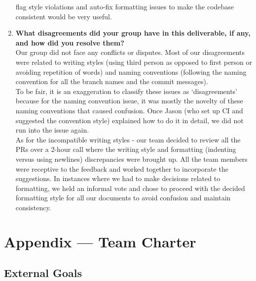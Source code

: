 \documentclass{article}
\begin{document}
\begin{enumerate}
    flag style violations and auto-fix formatting issues to make the codebase consistent would be very useful.
    \item \textbf{What disagreements did your group have in this deliverable, if any,
    and how did you resolve them?}\\
    \newline
    Our group did not face any conflicts or disputes. Most of our disagreements were related to writing styles
    (using third person as opposed to first person or avoiding repetition of words) and naming conventions (following
    the naming convention for all the branch names and the commit messages).\\
    \newline
    To be fair, it is an exaggeration to classify these issues as `disagreements' because for the naming convention 
    issue, it was mostly the novelty of these naming conventions that caused confusion. Once Jason (who set up CI and
    suggested the convention style) explained how to do it in detail, we did not run into the issue again.\\
    \newline
    As for the incompatible writing styles -  our team decided to review all the PRs over a 2-hour call where the writing
    style and formatting (indenting versus using newlines) discrepancies were brought up. All the team members were
    receptive to the feedback and worked together to incorporate the suggestions. In instances where we had to make
    decisions related to formatting, we held an informal vote and chose to proceed with the decided formatting style
    for all our documents to avoid confusion and maintain consistency.
\end{enumerate}

\newpage{}

\section*{Appendix --- Team Charter}


\subsection*{External Goals}

\end{document}
